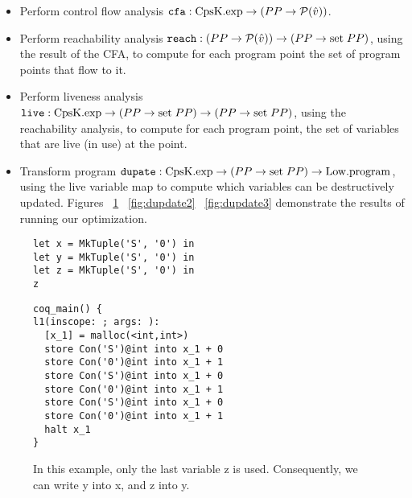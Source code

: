 \documentclass{article}
\begin{document}
\begin{itemize}
\item Perform control flow analysis ${\tt cfa} : {\rm CpsK.exp} \rightarrow (PP \rightarrow \mathcal{P}(\hat{v}))$. 
\item Perform reachability analysis ${\tt reach} : (PP \rightarrow \mathcal{P}(\hat{v})) \rightarrow (PP \rightarrow {\rm set} \; PP)$, using the result of the CFA, to compute for each program point the set of program points that flow to it.
\item Perform liveness analysis ${\tt live} : {\rm CpsK.exp} \rightarrow (PP \rightarrow {\rm set} \; PP) \rightarrow (PP \rightarrow {\rm set} \; PP)$, using the reachability analysis, to compute for each program point, the set of variables that are live (in use) at the point.
\item Transform program ${\tt dupate} : {\rm CpsK.exp} \rightarrow (PP \rightarrow {\rm set} \; PP) \rightarrow {\rm Low.program}$, using the live variable map to compute which variables can be destructively updated. Figures ~\ref{fig:dupdate1} ~\ref{fig:dupdate2} ~\ref{fig:dupdate3} demonstrate the results of running our optimization.
\end{itemize}

\begin{figure}
\centering
\begin{minipage}[t]{.4\textwidth}
\begin{lstlisting}
let x = MkTuple('S', '0') in
let y = MkTuple('S', '0') in
let z = MkTuple('S', '0') in
z
\end{lstlisting}
\end{minipage}
\hspace{20pt}
\begin{minipage}[t]{.4\textwidth}
\begin{lstlisting}
coq_main() {
l1(inscope: ; args: ):
  [x_1] = malloc(<int,int>)
  store Con('S')@int into x_1 + 0
  store Con('0')@int into x_1 + 1
  store Con('S')@int into x_1 + 0
  store Con('0')@int into x_1 + 1
  store Con('S')@int into x_1 + 0
  store Con('0')@int into x_1 + 1
  halt x_1
}
\end{lstlisting}
\end{minipage}
\label{fig:dupdate1}
\caption{In this example, only the last variable z is
   used. Consequently, we can write y into x, and z into y. }
\end{figure}
\end{document}
